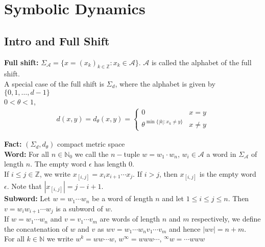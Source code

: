 \documentclass[12pt]{article}
\begin{document}
\newpage
\section{Symbolic Dynamics}

\subsection{Intro and Full Shift} 

\textbf{Full shift:} $\Sigma_{\mathcal{A}} = \{x = (x_k)_{k \in \mathbb{Z}}: x_k \in \mathcal{A}\}$. $\mathcal{A}$ is called the alphabet of the full shift.\\

A special case of the full shift is $\Sigma_d$, where the alphabet is given by $\{0, 1, \ldots, d-1\}$\\

$0 < \theta < 1$,
\begin{align*}
d(x, y) = d_{\theta}(x, y) = \begin{cases} 
      0 & x = y \\
      \theta^{\min\{|k|: x_k \neq y\}} & x \neq y
   \end{cases}
\end{align*}

\textbf{Fact:} $(\Sigma_d, d_{\theta})$ compact metric space\\

\textbf{Word:} For all $n \in \mathbb{N}_0$ we call the $n-$tuple $w = w_1 \cdot w_n$, $w_i \in \mathcal{A}$ a word in $\Sigma_{\mathcal{A}}$ of length $n$. The empty word $\epsilon$ has length $0$.\\

If $i \leq j \in \mathbb{Z}$, we write $x_{[i, j]} = x_ix_{i+1} \cdots x_j$. If $i > j$, then $x_{[i, j]}$ is the empty word $\epsilon$. Note that $|x_{[i, j]}| = j-i+1$.\\

\textbf{Subword:} Let $w = w_1 \cdots w_n$ be a word of length $n$ and let $1 \leq i \leq j \leq n$. Then $v = w_i w_{i+1} \cdots w_j$ is a subword of $w$.\\

If $w = w_1 \cdots w_n$ and $v = v_1 \cdots v_m$ are words of length $n$ and $m$ respectively, we define the concatenation of $w$ and $v$ as $wv = w_1 \cdots w_nv_1 \cdots v_m$ and hence $|wv| = n+m$.\\

For all $k \in \mathbb{N}$ we write $w^k = w w \cdots w$, $w^{\infty} = www\cdots$, $^{\infty}w = \cdots www$\\
\end{document}
